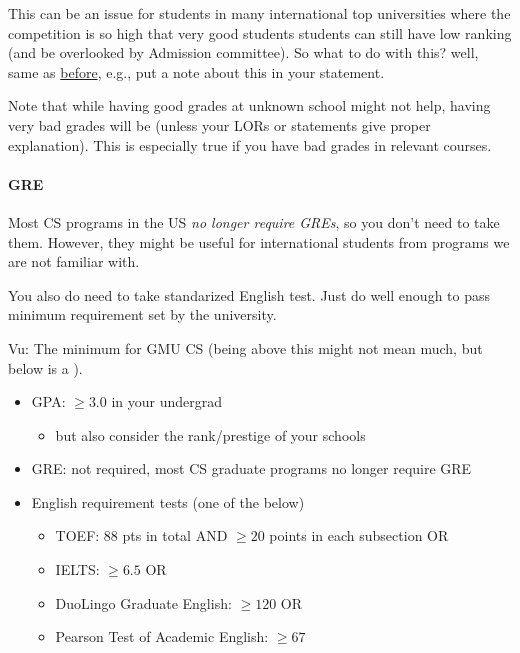 \documentclass[10pt]{article}
\newcommand{\red}[1]{{\color{red}{#1}}}
\begin{document}
This can be an issue for students in many international top universities 
where the competition is so high that very good students students can still have low ranking (and be overlooked by Admission committee).
So what to do with this? well, same as \hyperref[sec:your-school]{before}, e.g., put a note about this in your statement.

Note that while having good grades at unknown school might not help,
having very bad grades will be \red{red flag} (unless your LORs or
statements give proper explanation). This is especially true if you
have bad grades in relevant courses.

\paragraph{GRE} Most CS programs in the US \emph{no longer require GREs}, so you don't need to
take them. However, they might be useful for international students from programs we are not familiar with. 

You also do need to
take standarized English test. Just do well enough to pass minimum
requirement set by the university.

\begin{tcolorbox}[left=1pt,right=1pt,top=1pt,bottom=1pt]
Vu: The minimum for GMU CS (being above this might not mean much, but below is a \red{red flag}).
\begin{itemize}
\item GPA: $\ge 3.0$ in your undergrad
  \begin{itemize}
  \item but also consider the rank/prestige of your schools
  \end{itemize}
\item GRE: not required, most CS graduate programs no longer require GRE
\item English requirement tests (one of the below)
  \begin{itemize}    
  \item TOEF: 88 pts in total AND $\ge 20$ points in each subsection OR
  \item IELTS: $\ge 6.5$ OR
  \item DuoLingo Graduate English: $\ge 120$ OR 
  \item Pearson Test of Academic English: $\ge 67$
  \end{itemize}  
\end{itemize}
\end{tcolorbox}
\end{document}

